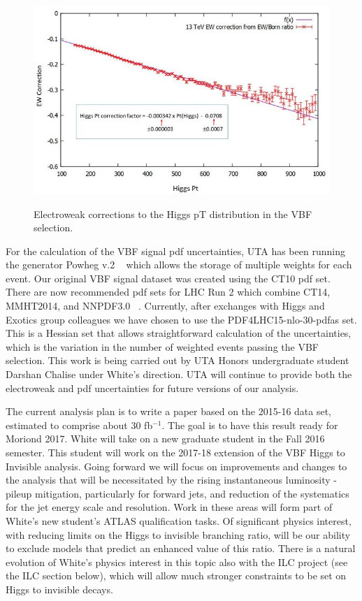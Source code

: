 \begin{figure}[htb]
\centering

      \includegraphics[scale=0.5]{images/HAWK_EW_corrections.JPG}
      \label{fig:HAWK_EW}

\caption{Electroweak corrections to the Higgs pT distribution in the VBF selection.}
\end{figure}

For the calculation of the VBF signal pdf uncertainties, UTA has been running the generator Powheg v.2 ~\cite{Powheg} which allows the storage of
multiple weights for each event. Our original VBF signal dataset was created using the CT10 pdf set. There are now recommended pdf 
sets for LHC Run 2 which combine CT14, MMHT2014, and NNPDF3.0 ~\cite{Run2PDF}. Currently, after exchanges with Higgs and Exotics group colleagues 
we have chosen to use the PDF4LHC15-nlo-30-pdfas set. This is a Hessian set that allows straightforward calculation of the 
uncertainties, which is the variation in the number of weighted events passing the VBF selection. This work is being carried out 
by UTA Honors undergraduate student Darshan Chalise under White's direction. UTA will continue to provide both the electroweak and 
pdf uncertainties for future versions of our analysis.
  
The current analysis plan is to write a paper based on the 2015-16 data set, estimated to comprise about 30 fb$^{-1}$. The goal is to have 
this result ready for Moriond 2017. White will take on a new graduate student in the Fall 2016 semester. This student will work on the
2017-18 extension of the VBF Higgs to Invisible analysis. Going forward we will focus on improvements and changes to the analysis that
will be necessitated by the rising instantaneous luminosity - pileup mitigation, particularly for forward jets, and reduction of the
systematics for the jet energy scale and resolution. Work in these areas will form part of White's new student's ATLAS qualification 
tasks. Of significant physics interest, with reducing limits on the Higgs to invisible branching ratio, will be our ability to exclude 
models that predict an enhanced value of this ratio. There is a natural evolution of White's physics interest in this topic also with the ILC project (see the ILC
 section below), which will allow much stronger constraints to be set on Higgs to invisible decays.

